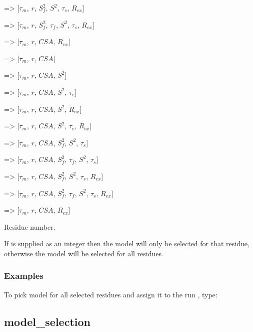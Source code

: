   => [$\tau_m$, $r$, $S^2_f$, $S^2$, $\tau_s$, $R_{ex}$]
    
  => [$\tau_m$, $r$, $S^2_f$, $\tau_f$, $S^2$, $\tau_s$, $R_{ex}$]
    
  => [$\tau_m$, $r$, $CSA$, $R_{ex}$]

    
  => [$\tau_m$, $r$, $CSA$]
    
  => [$\tau_m$, $r$, $CSA$, $S^2$]
    
  => [$\tau_m$, $r$, $CSA$, $S^2$, $\tau_e$]
    
  => [$\tau_m$, $r$, $CSA$, $S^2$, $R_{ex}$]
    
  => [$\tau_m$, $r$, $CSA$, $S^2$, $\tau_e$, $R_{ex}$]
    
  => [$\tau_m$, $r$, $CSA$, $S^2_f$, $S^2$, $\tau_s$]
    
  => [$\tau_m$, $r$, $CSA$, $S^2_f$, $\tau_f$, $S^2$, $\tau_s$]
    
  => [$\tau_m$, $r$, $CSA$, $S^2_f$, $S^2$, $\tau_s$, $R_{ex}$]
    
  => [$\tau_m$, $r$, $CSA$, $S^2_f$, $\tau_f$, $S^2$, $\tau_s$, $R_{ex}$]
    
  => [$\tau_m$, $r$, $CSA$, $R_{ex}$]



Residue number.

If 
 is supplied as an integer then the model will only be selected for that
residue, otherwise the model will be selected for all residues.



\subsubsection{Examples}

To pick model 
 for all selected residues and assign it to the run 
, type:





\newpage

\subsection{model\_selection}


